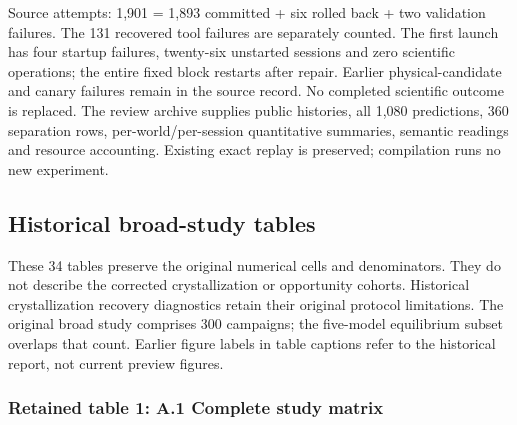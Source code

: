 \documentclass[10pt,a4paper]{article}
\begin{document}
Source attempts: 1,901 = 1,893 committed + six rolled back + two validation failures. The 131 recovered tool failures are separately counted. The first launch has four startup failures, twenty-six unstarted sessions and zero scientific operations; the entire fixed block restarts after repair. Earlier physical-candidate and canary failures remain in the source record. No completed scientific outcome is replaced. The review archive supplies public histories, all 1,080 predictions, 360 separation rows, per-world/per-session quantitative summaries, semantic readings and resource accounting. Existing exact replay is preserved; compilation runs no new experiment.

\subsection{Historical broad-study tables}\label{historical-broad-study-tables}

These 34 tables preserve the original numerical cells and denominators. They do not describe the corrected crystallization or opportunity cohorts. Historical crystallization recovery diagnostics retain their original protocol limitations. The original broad study comprises 300 campaigns; the five-model equilibrium subset overlaps that count. Earlier figure labels in table captions refer to the historical report, not current preview figures.

\subsubsection{Retained table 1: A.1 Complete study matrix}\label{retained-table-1-a.1-complete-study-matrix}
\end{document}
